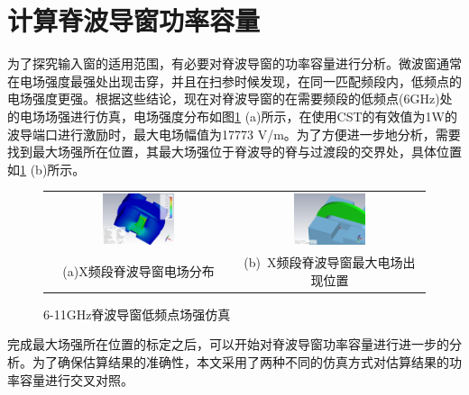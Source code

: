\documentclass[master]{thesis-uestc}
\begin{document}
\section{计算脊波导窗功率容量}
为了探究输入窗的适用范围，有必要对脊波导窗的功率容量进行分析。微波窗通常在电场强度最强处出现击穿，并且在扫参时候发现，在同一匹配频段内，低频点的电场强度更强。根据这些结论，现在对脊波导窗的在需要频段的低频点(6GHz)处的电场场强进行仿真，电场强度分布如图\ref{fig:X频段脊波导窗低频点场强仿真} (a)所示，在使用CST的有效值为1W的波导端口进行激励时，最大电场幅值为17773 V/m。为了方便进一步地分析，需要找到最大场强所在位置，其最大场强位于脊波导的脊与过渡段的交界处，具体位置如\ref{fig:X频段脊波导窗低频点场强仿真} (b)所示。
\begin{figure}[!htb]
    \small
    \centering
    \begin{tabular}{@{\ }c@{\ }c}
        \includegraphics[width=0.4\textwidth]{pic/chapter3/X频段等效1W最大场强.png} & 
        \hspace{5pt}
        \includegraphics[width=0.4\textwidth]{pic/chapter3/X频段最大场强出现位置.png}     \\
        \mbox{\small (a)X频段脊波导窗电场分布}                                                                               & 
        \mbox{\small (b) X频段脊波导窗最大电场出现位置}                                                                                  \\
    \end{tabular}
    \caption{6-11GHz脊波导窗低频点场强仿真}
    \label{fig:X频段脊波导窗低频点场强仿真}
\end{figure}

完成最大场强所在位置的标定之后，可以开始对脊波导窗功率容量进行进一步的分析。为了确保估算结果的准确性，本文采用了两种不同的仿真方式对估算结果的功率容量进行交叉对照。
\end{document}
